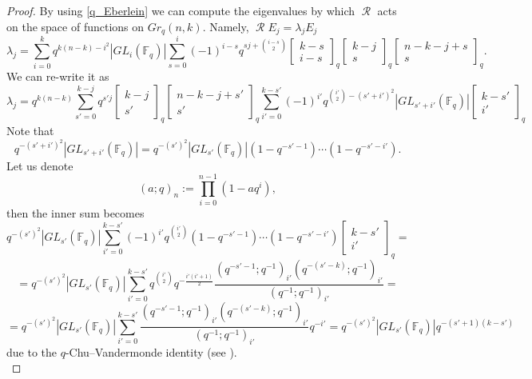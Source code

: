 \documentclass[12pt,reqno]{amsart}
\theoremstyle{definition}
\theoremstyle{remark}
\numberwithin{equation}{section}
\newcommand{\GL}[1]{GL_{#1}(\mathbb{F}_q)}
\DeclareMathOperator{\R}{\mathcal{R}}
\begin{document}
\begin{proof}
    By using \eqref{q_Eberlein} we can compute the eigenvalues by which $\R$ acts on the space of functions on $Gr_q(n,k)$. Namely, $\R E_j = \lambda_j E_j$
    \begin{equation}
        \lambda_j = \sum_{i=0}^{k}q^{k(n-k)-i^2}|\GL{i}|\sum_{s=0}^i (-1)^{i-s}q^{sj+{i-s\choose 2}}\begin{bmatrix}
    k-s\\
    i-s
\end{bmatrix}_q \begin{bmatrix}
    k-j\\
    s
\end{bmatrix}_q \begin{bmatrix}
    n-k-j+s\\
    s
\end{bmatrix}_q.
    \end{equation}
    We can re-write it as
    \[
    \lambda_j = q^{k(n-k)}\sum_{s'=0}^{k-j}q^{s'j}\begin{bmatrix}
    k-j\\
    s'
\end{bmatrix}_q \begin{bmatrix}
    n-k-j+s'\\
    s'
\end{bmatrix}_q
\sum_{i'=0}^{k-s'}(-1)^{i'}q^{{i' \choose 2}-(s'+i')^2}|\GL{s'+i'}|\begin{bmatrix}
    k-s'\\
    i'
\end{bmatrix}_q
    \]
    Note that
    \[
    q^{-(s'+i')^2}|\GL{s'+i'}|=q^{-(s')^2}|\GL{s'}|(1-q^{-s'-1})\cdots(1-q^{-s'-i'}).
    \]
    Let us denote
    \begin{equation}\label{q-Pochhammer}
        (a;q)_n:=\prod_{i=0}^{n-1}(1-aq^i),
    \end{equation}
    then the inner sum becomes
    \[
    q^{-(s')^2}|\GL{s'}|\sum_{i'=0}^{k-s'}(-1)^{i'}q^{{i' \choose 2}}(1-q^{-s'-1})\cdots(1-q^{-s'-i'})\begin{bmatrix}
    k-s'\\
    i'
\end{bmatrix}_q=
    \]
    \[
    =q^{-(s')^2}|\GL{s'}|\sum_{i'=0}^{k-s'}q^{{i' \choose 2}}q^{-\frac{i'(i'+1)}{2}} \frac{(q^{-s'-1};q^{-1})_{i'} (q^{-(s'-k)};q^{-1})_{i'}}{(q^{-1};q^{-1})_{i'}}=
    \]
    \[
    =q^{-(s')^2}|\GL{s'}|\sum_{i'=0}^{k-s'} \frac{(q^{-s'-1};q^{-1})_{i'} (q^{-(s'-k)};q^{-1})_{i'}}{(q^{-1};q^{-1})_{i'}}q^{-i'}=q^{-(s')^2}|\GL{s'}| q^{-(s'+1)(k-s')}
    \]
    due to the $q$-Chu–Vandermonde identity (see \cite[Appendix II.6]{GM}).\\


\end{proof}
\end{document}
